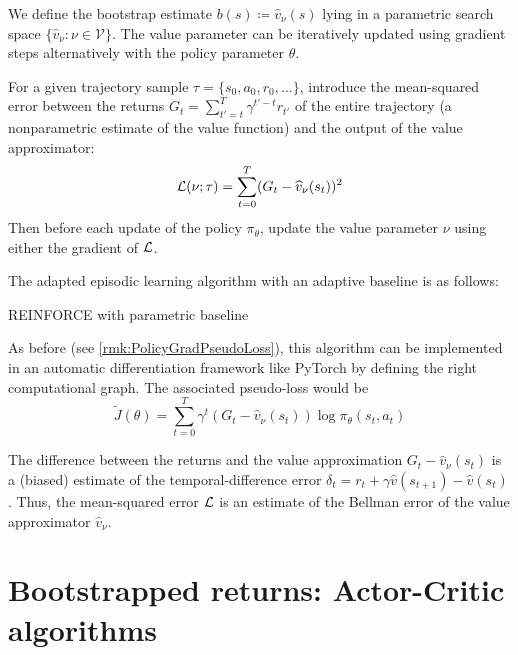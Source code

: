 \documentclass[../course-notes.tex]{subfiles}
\begin{document}
We define the bootstrap estimate $b(s) \coloneqq \widehat{v}_\nu(s)$ lying in a parametric search space $\{\widehat{v}_\nu : \nu \in \mathcal{V}\}$. The value parameter can be iteratively updated using gradient steps alternatively with the policy parameter $\theta$.

For a given trajectory sample $\tau=\{s_0,a_0,r_0,\ldots\}$, introduce the mean-squared error between the returns $G_t = \sum_{t'= t}^T \gamma^{t'-t} r_{t'}$ of the entire trajectory (a nonparametric estimate of the value function) and the output of the value approximator:
\begin{equation}
	\mathcal{L}(\nu; \tau) =
	\sum_{t=0}^{T} (G_t-\widehat{v}_\nu(s_t))^2
\end{equation}
Then before each update of the policy $\pi_\theta$, update the value parameter $\nu$ using either the gradient of $\mathcal{L}$.

The adapted episodic learning algorithm with an adaptive baseline is as follows:
\begin{algorithm}
	\caption{REINFORCE with parametric baseline}\label{algo:REINFORCEparamBaseline}
\end{algorithm}

As before (see \cref{rmk:PolicyGradPseudoLoss}), this algorithm can be implemented in an automatic differentiation framework like \textsf{PyTorch} by defining the right computational graph. The associated pseudo-loss would be
\[
\tilde{J}(\theta) = 
\sum_{t=0}^T \gamma^t (G_t - \widehat{v}_\nu(s_t)) \log\pi_\theta(s_t, a_t)
\]

\begin{remark}
	The difference between the returns and the value approximation $G_t - \widehat{v}_\nu(s_t)$ is a (biased) estimate of the temporal-difference error $\delta_t = r_t + \gamma \widehat{v}(s_{t+1}) - \widehat{v}(s_t)$. Thus, the mean-squared error $\mathcal{L}$ is an estimate of the Bellman error of the value approximator $\widehat{v}_\nu$.
\end{remark}



\section{Bootstrapped returns: Actor-Critic algorithms}
\end{document}
